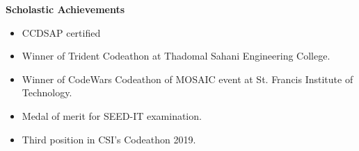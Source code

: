 \colorbox{titleColor}{\parbox{6.7in}{\textbf{Scholastic Achievements}}}
\begin{itemize}
\setlength{\itemsep}{1pt}
\item CCDSAP certified
\item Winner of Trident Codeathon at Thadomal Sahani Engineering College.
\item Winner of CodeWars Codeathon of MOSAIC event at St. Francis Institute of Technology.
\item Medal of merit for SEED-IT examination.
\item Third position in CSI's Codeathon 2019.
\end{itemize}
